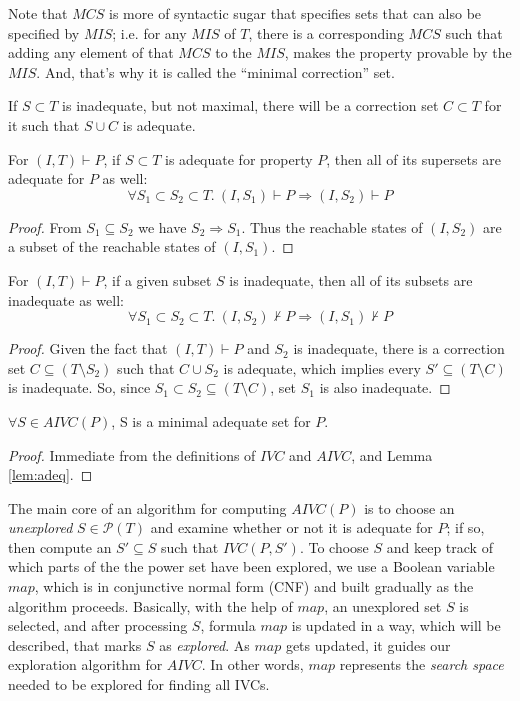 Note that $MCS$ is more of syntactic sugar that specifies sets that can also be specified by $MIS$; i.e. for any $MIS$ of $T$, there is a corresponding $MCS$ such that adding any element of that $MCS$ to the $MIS$, makes the property provable by the $MIS$.
And, that's why it is called the ``minimal correction'' set.
\begin{note}
If $S \subset T$ is inadequate, but not maximal, there will be a correction set $C \subset T$ for it such that $S \cup C$ is adequate.
\end{note}

\begin{lemma}
\label{lem:adeq}
For $(I, T) \vdash P$, if $S \subset T$ is adequate for property $P$, then all of its supersets are adequate for $P$ as well:
\allowbreak $$\forall S_1 \subset S_2 \subset T.~ (I, S_1) \vdash P \Rightarrow (I, S_2) \vdash P$$
\end{lemma}
\begin{proof}
From $S_1 \subseteq S_2$ we have $S_2 \Rightarrow S_1$. Thus the
  reachable states of $(I, S_2)$ are a subset of the reachable states
  of $(I, S_1)$.
\end{proof}

\begin{lemma}
\label{lem:inadeq}
For $(I, T) \vdash P$, if a given subset $S$ is inadequate, then all of its subsets are inadequate as well:
\allowbreak $$\forall S_1 \subset S_2 \subset T.~ (I, S_2) \nvdash P \Rightarrow (I, S_1) \nvdash P$$
\end{lemma}
\begin{proof}
Given the fact that $(I, T) \vdash P$ and $S_2$ is inadequate,
there is a correction set $C \subseteq (T\setminus S_2)$ such that
$C \cup S_2$ is adequate, which implies every $S' \subseteq (T \setminus C)$ is inadequate.
So, since $S_1 \subset S_2 \subseteq (T \setminus C)$, set $S_1$ is also inadequate.
\end{proof}

\begin{corol}
$\forall S \in AIVC(P)$, S is a minimal adequate set for $P$.
\end{corol}
\begin{proof}
  Immediate from the definitions of $IVC$ and $AIVC$, and Lemma \ref{lem:adeq}.
\end{proof}

The main core of an algorithm for computing $AIVC(P)$ is to choose an \emph{unexplored} $S \in \mathcal{P}(T)$ and examine whether or not it is adequate for $P$; if so, then compute an $S' \subseteq S$ such that $IVC(P, S')$.
To choose $S$ and keep track of which parts of the the power set
have been explored, we use a Boolean variable $map$, which is
in conjunctive normal form (CNF) and built gradually as the algorithm proceeds.
Basically, with the help of $map$, an unexplored set $S$ is selected, and after processing $S$,
formula $map$ is updated in a way, which will be described, that marks $S$ as \emph{explored}.
As $map$ gets updated, it guides our exploration algorithm for $AIVC$.
In other words, $map$ represents the \emph{search space} needed to be explored for finding all IVCs.

